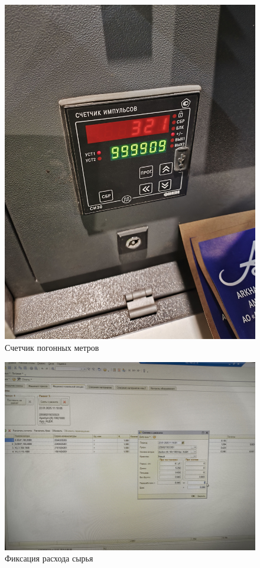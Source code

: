 \begin{figure}
\begin{center}
 \includegraphics[height=0.4\textheight, keepaspectratio]{Pics/V Метраж рулонов.jpg}
\end{center}
 \caption{Счетчик погонных метров}
 \label{pic:V Метраж рулонов}
\end{figure}

\begin{figure}
\begin{center}
 \includegraphics[height=0.4\textheight, keepaspectratio]{Pics/V фиксация на раскатах.jpg}
\end{center}
 \caption{Фиксация расхода сырья}
 \label{pic:V фиксация на раскатах}
\end{figure}


